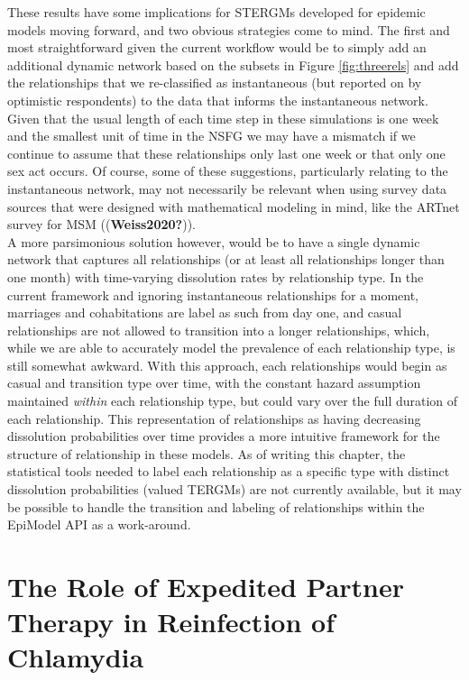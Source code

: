 \documentclass [11pt, proquest] {uwthesis}[2015/03/03]
\begin{document}
These results have some implications for STERGMs developed for epidemic models moving forward, and two obvious strategies come to mind. The first and most straightforward given the current workflow would be to simply add an additional dynamic network based on the subsets in Figure \ref{fig:threerels} and add the relationships that we re-classified as instantaneous (but reported on by optimistic respondents) to the data that informs the instantaneous network. Given that the usual length of each time step in these simulations is one week and the smallest unit of time in the NSFG we may have a mismatch if we continue to assume that these relationships only last one week or that only one sex act occurs. Of course, some of these suggestions, particularly relating to the instantaneous network, may not necessarily be relevant when using survey data sources that were designed with mathematical modeling in mind, like the ARTnet survey for MSM ((\textbf{Weiss2020?})).\\
A more parsimonious solution however, would be to have a single dynamic network that captures all relationships (or at least all relationships longer than one month) with time-varying dissolution rates by relationship type. In the current framework and ignoring instantaneous relationships for a moment, marriages and cohabitations are label as such from day one, and casual relationships are not allowed to transition into a longer relationships, which, while we are able to accurately model the prevalence of each relationship type, is still somewhat awkward. With this approach, each relationships would begin as casual and transition type over time, with the constant hazard assumption maintained \emph{within} each relationship type, but could vary over the full duration of each relationship. This representation of relationships as having decreasing dissolution probabilities over time provides a more intuitive framework for the structure of relationship in these models. As of writing this chapter, the statistical tools needed to label each relationship as a specific type with distinct dissolution probabilities (valued TERGMs) are not currently available, but it may be possible to handle the transition and labeling of relationships within the EpiModel API as a work-around.

\hypertarget{ept}{%
\chapter{The Role of Expedited Partner Therapy in Reinfection of Chlamydia}\label{ept}}
\end{document}
